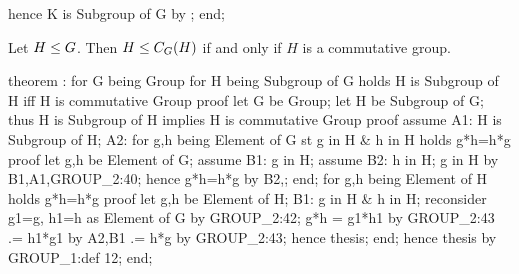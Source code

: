   hence K is  Subgroup of G by ;
end;
\eatline
{}\nwendcode{}\nwdocspar
\begin{theorem}
Let $H\leq G$.
Then $H\leq C_{G}(H)$ if and only if $H$ is a commutative group.
\end{theorem}

\nwenddocs{}\endmoddef\nwstartdeflinemarkup{}\nwenddeflinemarkup
theorem :
  for G being Group
  for H being Subgroup of G
  holds H is Subgroup of  H iff H is commutative Group
proof
  let G be Group;
  let H be Subgroup of G;
  thus H is Subgroup of  H implies H is commutative Group
  proof
    assume A1: H is Subgroup of  H;
    A2: for g,h being Element of G st g in H & h in H holds g*h=h*g
    proof
      let g,h be Element of G;
      assume B1: g in H;
      assume B2: h in H;
      g in  H by B1,A1,GROUP_2:40;
      hence g*h=h*g by B2,;
    end;
    for g,h being Element of H holds g*h=h*g
    proof
      let g,h be Element of H;
      B1: g in H & h in H;
      reconsider g1=g, h1=h as Element of G by GROUP_2:42;
      g*h = g1*h1 by GROUP_2:43
         .= h1*g1 by A2,B1
         .= h*g by GROUP_2:43;
      hence thesis;
    end;
    hence thesis by GROUP_1:def 12;
  end;

